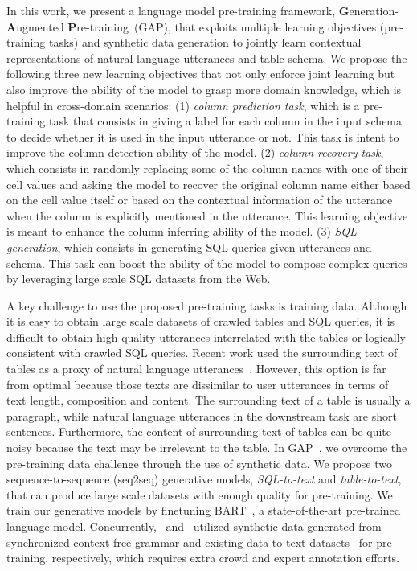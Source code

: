 \documentclass[letterpaper]{article} \usepackage{aaai21}  \usepackage{times}  \usepackage{helvet} \usepackage{courier}  \usepackage[hyphens]{url}  \usepackage{graphicx} \usepackage{booktabs}
\newcommand{\modelname}{\textsc{GAP~}}
\begin{document}
In this work, we present a language model pre-training framework, \textbf{G}eneration-\textbf{A}ugmented \textbf{P}re-training~(\textsc{GAP}),
that exploits multiple learning objectives (pre-training tasks) and synthetic data generation to jointly learn contextual representations of natural language utterances and table schema.
We propose the following three new learning objectives that not only enforce joint learning but also improve the ability of the model to grasp more domain knowledge, which is helpful in cross-domain scenarios:
(1) \emph{column prediction task},
which is a pre-training task that consists in giving a label for each column in the input schema to decide whether it is used in the input utterance or not. This task is intent to improve the column detection ability of the model.
(2) \emph{column recovery task}, 
which consists in randomly replacing some of the column names with one of their cell values and asking the model to recover the original column name either based on the cell value itself or based on the contextual information of the utterance when the column is explicitly mentioned in the utterance. This learning objective is meant to enhance the column inferring ability of the model.
(3) \emph{SQL generation},
which consists in generating SQL queries given utterances and schema.
This task can boost the ability of the model to compose complex queries by leveraging large scale SQL datasets from the Web.

A key challenge to use the proposed pre-training tasks is training data.
Although it is easy to obtain large scale datasets of crawled tables and SQL queries, 
it is difficult to obtain high-quality utterances interrelated with the tables or logically consistent with crawled SQL queries.
Recent work used the surrounding text of tables as a proxy of natural language utterances~\cite{yin2020tabert, herzig2020tapas}.
However, this option is far from optimal because those texts are dissimilar to user utterances in terms of text length, composition and content.
The surrounding text of a table is usually a paragraph, while natural language utterances in the downstream task are short sentences.
Furthermore, the content of surrounding text of tables can be quite noisy because the text may be irrelevant to the table.
In \modelname,
we overcome the pre-training data challenge through the use of synthetic data.
We propose two sequence-to-sequence (seq2seq) generative models, \emph{SQL-to-text} and \emph{table-to-text}, that can produce large scale datasets with enough quality for pre-training.
We train our generative models by finetuning BART~\cite{lewis2019bart}, a state-of-the-art pre-trained language model.
Concurrently,~\citet{yu2020grappa} and~\citet{deng2020structure} utilized synthetic data generated from synchronized context-free grammar and existing data-to-text datasets~\cite{parikh2020totto} for pre-training, respectively, which requires extra crowd and expert annotation efforts.
\end{document}
